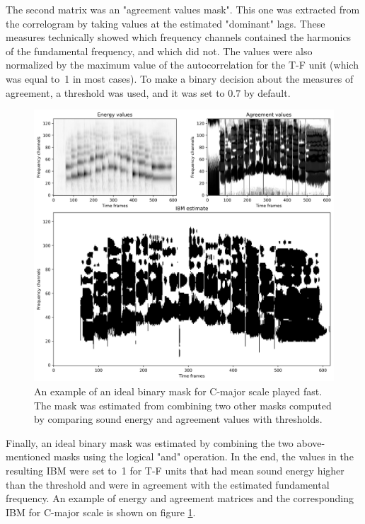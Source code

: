 The second matrix was an "agreement values mask". This one was extracted from the correlo\-gram by taking values at the estimated "dominant" lags. These measures technically showed which frequency channels contained the harmonics of the fundamental frequency, and which did not. The values were also normalized by the maximum value of the autocorrelation for the T-F unit (which was equal to~1 in most cases). To make a binary decision about the measures of agreement, a threshold was used, and it was set to $0.7$ by default.\\

\begin{figure}[t]
	\centering
	\includegraphics[width=\textwidth]{include/ibm_example}
	\caption[An example of an ideal binary mask for C-major scale]{An example of an ideal binary mask for C-major scale played fast. The mask was estimated from combining two other masks computed by comparing sound energy and agreement values with thresholds.}
	\label{img:ibm_example}
\end{figure}

Finally, an ideal binary mask was estimated by combining the two above-mentioned masks using the logical "and" operation. In the end, the values in the resulting IBM were set to~1 for T-F units that had mean sound energy higher than the threshold and were in agreement with the estimated fundamental frequency. An example of energy and agreement matrices and the corresponding IBM for C-major scale is shown on figure \ref{img:ibm_example}.\\

